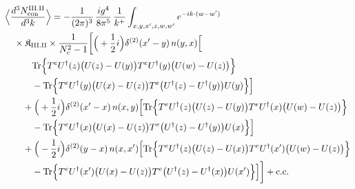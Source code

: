 \begingroup\small
\begin{align}\label{eq:S-III.II-2}
&\Big\langle\frac{d^{3}N^{\rm III.II}_{{\rm con}}}{d^{3}k}\Big\rangle=-\frac{1}{(2\pi)^{3}}\, \frac{ig^{4}}{8\pi^{5}}\, \frac{1}{k^{+}} \int_{x,y,x',z,w,w'}e^{-ik\cdot(w-w')}\notag\\
&\quad \times \mathfrak{K}_{\rm III.II} \times \frac{1}{N_{c}^{2}-1}\bigg[\Big(+\frac{1}{2}i\Big)\delta^{(2)}(x'-y)\, n(y,x)\Big[\notag\\
&\quad\quad\quad {\rm Tr}\Big\{T^{e}U^{\dagger}(z)\big(U(z)-U(y)\big)T^{e}U^{\dagger}(y)\big(U(w)-U(z)\big)\Big\}\notag\\
&\quad\quad\quad -{\rm Tr}\Big\{T^{e}U^{\dagger}(y)\big(U(x)-U(z)\big)T^{e}\big(U^{\dagger}(z)-U^{\dagger}(y)\big)U(y)\Big\}\Big]\notag\\
&\quad\quad +\Big(+\frac{1}{2}i\Big)\delta^{(2)}(x'-x)\, n(x,y)\Big[ {\rm Tr}\Big\{T^{e}U^{\dagger}(z)\big(U(z)-U(y)\big)T^{e}U^{\dagger}(x)\big(U(w)-U(z)\big)\Big\}\notag\\
&\quad\quad\quad -{\rm Tr}\Big\{T^{e}U^{\dagger}(x)\big(U(x)-U(z)\big)T^{e}\big(U^{\dagger}(z)-U^{\dagger}(y)\big)U(x)\Big\}\Big]\notag\\
&\quad\quad +\Big(-\frac{1}{2}i\Big)\delta^{(2)}(y-x)\, n(x,x')\Big[ {\rm Tr}\Big\{T^{e}U^{\dagger}(z)\big(U(z)-U(x)\big)T^{e}U^{\dagger}(x')\big(U(w)-U(z)\big)\Big\}\notag\\
&\quad\quad\quad -{\rm Tr}\Big\{T^{e}U^{\dagger}(x')\big(U(x)-U(z)\big)T^{e}\big(U^{\dagger}(z)-U^{\dagger}(x)\big)U(x')\Big\}\Big]\bigg] +{\rm c.c.}
\end{align}
\endgroup
